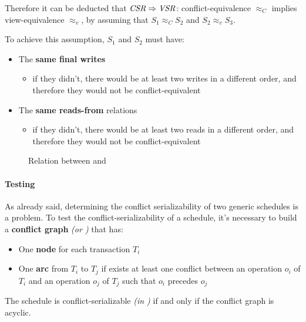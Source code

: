 \documentclass[english]{article}
\begin{document}
\bigskip
Therefore it can be deducted that \(\textit{CSR} \Rightarrow \textit{VSR}\): conflict-equivalence \(\approx_C\) implies view-equivalence \(\approx_v\), by assuming that \(S_1 \approx_C S_2\) and \(S_2 \approx_v S_3\).

To achieve this assumption, \(S_1\) and \(S_2\) must have:

\begin{itemize}
  \item The \textbf{same final writes}
        \begin{itemize}
          \item if they didn't, there would be at least two writes in a different order, and therefore they would not be conflict-equivalent
        \end{itemize}
  \item The \textbf{same reads-from} relations
        \begin{itemize}
          \item if they didn't, there would be at least two reads in a different order, and therefore they would not be conflict-equivalent
        \end{itemize}
\end{itemize}

\begin{figure}[htbp]
  \bigskip
  \centering
  \caption{Relation between \VSR and \CSR}
  \label{fig:relation-between-vsr-and-csr}
  \bigskip
\end{figure}

\paragraph{Testing \CSR}

As already said, determining the conflict serializability of two generic schedules is a \NPC problem.
To test the conflict-serializability of a schedule, it's necessary to build a \textbf{conflict graph} \textit{(or \CG)} that has:

\begin{itemize}
  \item One \textbf{node} for each transaction \(T_i\)
  \item One \textbf{arc} from \(T_i\) to \(T_j\) if exists at least one conflict between an operation \(o_i\) of \(T_i\) and an operation \(o_j\) of \(T_j\) such that \(o_i\) precedes \(o_j\)
\end{itemize}

The schedule is conflict-serializable \textit{(in \CSR)} if and only if the conflict graph is acyclic.
\end{document}
